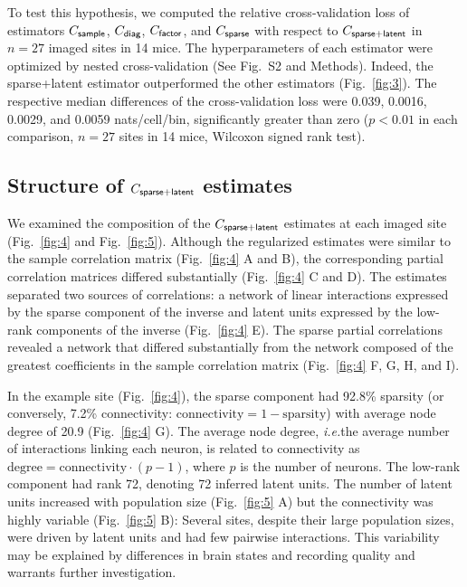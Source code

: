 To test this hypothesis, we computed the relative cross-validation loss of estimators  $C_{\sf sample}$, $C_{\sf diag}$, $C_{\sf factor}$, and $C_{\sf sparse}$ with respect to $C_{\sf sparse+latent}$ in $n=27$ imaged sites in 14 mice.  The hyperparameters of each estimator were optimized by nested cross-validation (See Fig.~S2 and  Methods). Indeed, the sparse+latent estimator outperformed the other estimators (Fig.~\ref{fig:3}). The respective median differences of the cross-validation loss were 0.039, 0.0016, 0.0029, and 0.0059 nats/cell/bin, significantly greater than zero ($p<0.01$ in each comparison, $n=27$ sites in 14 mice, Wilcoxon signed rank test).

\subsection*{Structure of $C_{\sf sparse+latent}$ estimates}
We examined the composition of the $C_{\sf sparse+latent}$ estimates at each imaged site (Fig.~\ref{fig:4} and Fig.~\ref{fig:5}). Although the regularized estimates were similar to the sample correlation matrix (Fig.~\ref{fig:4} A and B), the corresponding partial correlation matrices differed substantially (Fig.~\ref{fig:4} C and D). The estimates separated two sources of correlations: a network of linear interactions expressed by the sparse component of the inverse and latent units expressed by the low-rank components of the inverse (Fig.~\ref{fig:4} E). The sparse partial correlations revealed a network that differed substantially from the network composed of the greatest coefficients in the sample correlation matrix (Fig.~\ref{fig:4} F, G, H, and I).

In the example site (Fig.~\ref{fig:4}), the sparse component had 92.8\% sparsity (or conversely, 7.2\% connectivity: $\mbox{connectivity}=1-\mbox{sparsity}$) with average node degree of 20.9 (Fig.~\ref{fig:4} G). The average node degree, \emph{i.e.}\;the average number of interactions linking each neuron, is related to connectivity as $\mbox{degree} = \mbox{connectivity}\cdot(p-1)$, where $p$ is the number of neurons. The low-rank component had rank 72, denoting 72 inferred latent units. The number of latent units increased with population size (Fig.~\ref{fig:5} A) but the connectivity was highly variable (Fig.~\ref{fig:5} B): Several sites, despite their large population sizes, were driven by latent units and had few pairwise interactions. This variability may be explained by differences in brain states and recording quality and warrants further investigation.

